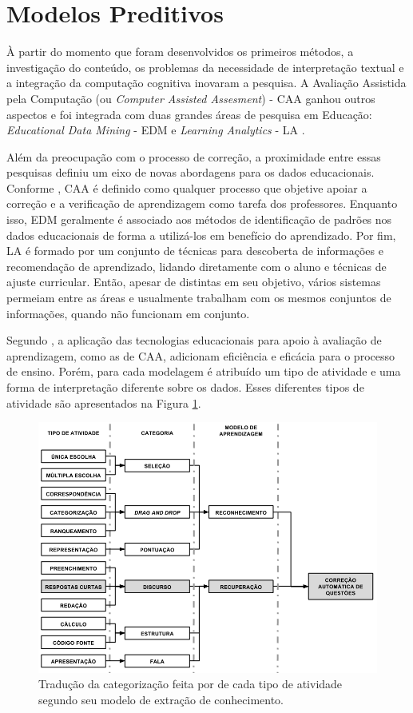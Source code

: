 \section{Modelos Preditivos}
À partir do momento que foram desenvolvidos os primeiros métodos, a investigação do conteúdo, os problemas da necessidade de interpretação textual e a integração da computação cognitiva inovaram a pesquisa. A Avaliação Assistida pela Computação (ou \textit{Computer Assisted Assesment}) - CAA \cite{conole2005} ganhou outros aspectos e foi integrada com duas grandes áreas de pesquisa em Educação: \textit{Educational Data Mining} - EDM \cite{romero2010} e \textit{Learning Analytics} - LA \cite{siemens2012}. 

Além da preocupação com o processo de correção, a proximidade entre essas pesquisas definiu um eixo de novas abordagens para os dados educacionais. Conforme , CAA é definido como qualquer processo que objetive apoiar a correção e a verificação de aprendizagem como tarefa dos professores. Enquanto isso, EDM geralmente é associado aos métodos de identificação de padrões nos dados educacionais de forma a utilizá-los em benefício do aprendizado. Por fim, LA é formado por um conjunto de técnicas para descoberta de informações e recomendação de aprendizado, lidando diretamente com o aluno e técnicas de ajuste curricular. Então, apesar de distintas em seu objetivo, vários sistemas permeiam entre as áreas e usualmente trabalham com os mesmos conjuntos de informações, quando não funcionam em conjunto.

Segundo , a aplicação das tecnologias educacionais para apoio à avaliação de aprendizagem, como as de CAA, adicionam eficiência e eficácia para o processo de ensino. Porém, para cada modelagem é atribuído um tipo de atividade e uma forma de interpretação diferente sobre os dados. Esses diferentes tipos de atividade são apresentados na Figura \ref{modelos-atividades}.

\begin{figure}[ht]
\centering
\includegraphics[width=.9\textwidth]{img/atividades.png}
\caption{Tradução da categorização feita por  de cada tipo de atividade segundo seu modelo de extração de conhecimento.}
\label{modelos-atividades}
\end{figure}

